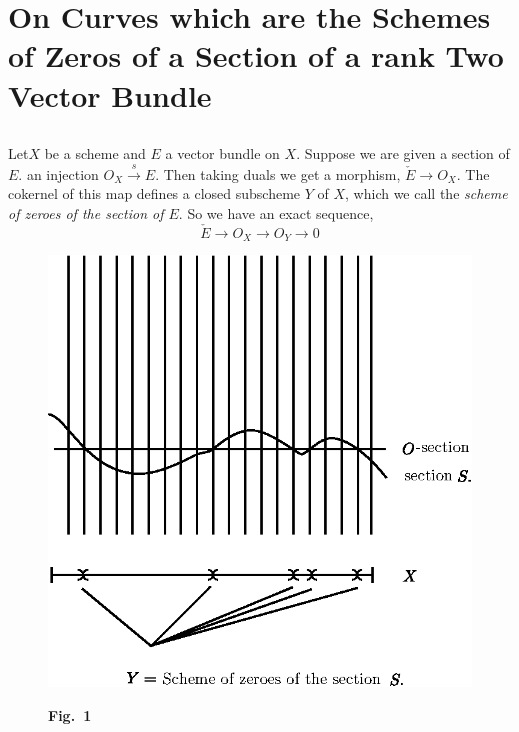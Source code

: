 
\chapter[On Curves which are the Schemes of
  Zeros of...]{On Curves which are the Schemes of
  Zeros of a Section of a rank Two Vector Bundle}\label{chap4}

\section{}\label{chap4:sec1}
 Let\pageoriginale $X$ be a scheme and $E$
a vector bundle on $X$. Suppose we are given a section of $E$. \ie an
injection $O_X\xrightarrow{s}E$. Then taking duals we get a morphism,
$\check{E}\longrightarrow O_X$. The cokernel of this map defines a
closed subscheme $Y$ of $X$, which we call the {\it scheme of zeroes
  of the section of $E$}. So we have an exact sequence,
$$
\check{E}\longrightarrow O_X\longrightarrow O_Y\longrightarrow 0
$$
\begin{figure}[H]
\centering
\includegraphics{figure/chap4-fig1.eps}

\medskip
{\bf Fig.~1}
\end{figure}

